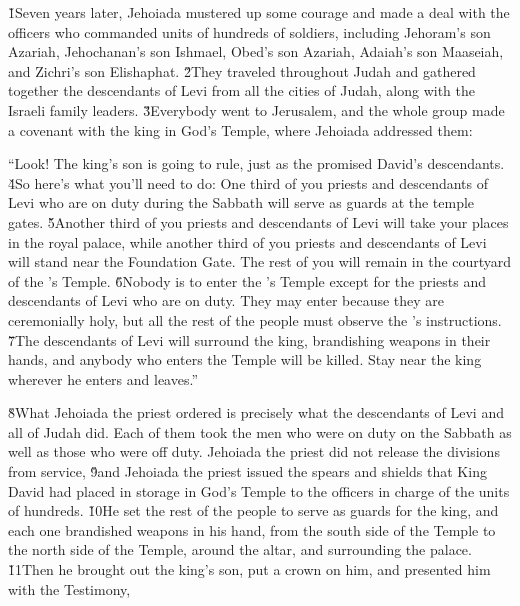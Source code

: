 \v{1}Seven years later, Jehoiada mustered up some courage and made a deal with the officers who commanded units of hundreds of soldiers, including Jehoram's son Azariah, Jehochanan's son Ishmael, Obed's son Azariah, Adaiah's son Maaseiah, and Zichri's son Elishaphat. \v{2}They traveled throughout Judah and gathered together the descendants of Levi from all the cities of Judah, along with the Israeli family leaders. \v{3}Everybody went to Jerusalem, and the whole group made a covenant with the king in God's Temple, where Jehoiada addressed them:

\begin{poetry}
\poeml ``Look! The king's son is going to rule, just as the  promised David's descendants. \v{4}So here's what you'll need to do: One third of you priests and descendants of Levi who are on duty during the Sabbath will serve as guards at the temple gates. \v{5}Another third of you priests and descendants of Levi will take your places in the royal palace, while another third of you priests and descendants of Levi will stand near the Foundation Gate. The rest of you will remain in the courtyard of the 's Temple. \v{6}Nobody is to enter the 's Temple except for the priests and descendants of Levi who are on duty. They may enter because they are ceremonially holy, but all the rest of the people must observe the 's instructions. \v{7}The descendants of Levi will surround the king, brandishing weapons in their hands, and anybody who enters the Temple will be killed. Stay near the king wherever he enters and leaves.''
\end{poetry}

\v{8}What Jehoiada the priest ordered is precisely what the descendants of Levi and all of Judah did. Each of them took the men who were on duty on the Sabbath as well as those who were off duty. Jehoiada the priest did not release the divisions from service, \v{9}and Jehoiada the priest issued the spears and shields that King David had placed in storage in God's Temple to the officers in charge of the units of hundreds. \v{10}He set the rest of the people to serve as guards for the king, and each one brandished weapons in his hand, from the south side of the Temple to the north side of the Temple, around the altar, and surrounding the palace. \v{11}Then he brought out the king's son, put a crown on him, and presented him with the Testimony,

